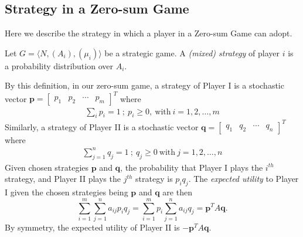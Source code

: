 \documentclass[journal, 11pt, a4paper, twoside]{IEEEtran}
\begin{document}
\subsection{Strategy in a Zero-sum Game}
    Here we describe the strategy in which a player in a Zero-sum Game can adopt.
    \begin{definition}
        Let $G = \langle N, (A_i), (\mu_i) \rangle$ be a strategic game. A \textit{(mixed) strategy} of player $i$ is a probability distribution over $A_i$.
    \end{definition}
\noindent By this definition, in our zero-sum game, a strategy of Player I is a stochastic vector $\bm{p} = \begin{bmatrix}
        p_1 & p_2 & \cdots & p_m
    \end{bmatrix}^T$ where 
    \begin{align*}
        \sum_{i } p_i = 1 \ ; \
        p_i  \geq 0, \ \text{with} \ i = 1, 2, \dots, m
    \end{align*}
    Similarly, a strategy of Player II is a stochastic vector $\bm{q} = \begin{bmatrix}
        q_1 & q_2 & \cdots & q_n
    \end{bmatrix}^T$ where 
    \begin{align*}
        \sum_{j = 1}^n q_j = 1 \ ; \
        q_j \geq 0 \ \text{with} \ j = 1, 2, \dots, n
    \end{align*}
    Given chosen strategies $\bm{p}$ and $\bm{q}$, the probability that Player I plays the $i^{th}$ strategy, and Player II plays the $j^{th}$ strategy is $p_iq_j$. The \textit{expected utility} to Player I given the chosen strategies being $\bm{p}$ and $\bm{q}$ are then
    \[
    \sum_{i = 1}^m \sum_{j=1}^n a_{ij}p_iq_j = \sum_{i=1}^m p_i \sum_{j=1}^n a_{ij}q_j = \bm{p}^T A\bm{q}.
    \]
    By symmetry, the expected utility of Player II is $-\bm{p}^T A\bm{q}$.
\end{document}
